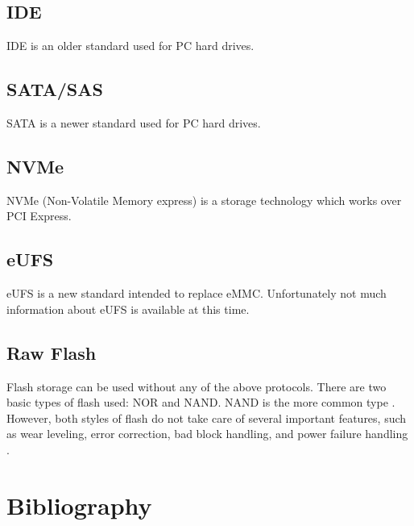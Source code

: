 \documentclass[12pt,article]{memoir}
\begin{document}
\section{IDE}
IDE is an older standard used for PC hard drives.
\section{SATA/SAS}
SATA is a newer standard used for PC hard drives.
\section{NVMe}
NVMe (Non-Volatile Memory express) is a storage technology which works over PCI Express.
\section{eUFS}
eUFS is a new standard intended to replace eMMC. Unfortunately not much information about eUFS is available at this time.
\section{Raw Flash}
Flash storage can be used without any of the above protocols. There are two basic types of flash used: NOR and NAND. NAND is the more common type \cite{toradex:flash}. However, both styles of flash do not take care of several important features, such as wear leveling, error correction, bad block handling, and power failure handling \cite{toradex:flash}.
\newpage

\chapter{Bibliography}
\printbibliography[heading=none]

\end{document}
